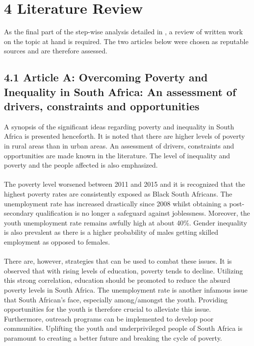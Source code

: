 \chapter*{4 Literature Review}
\label{lit}
As the final part of the step-wise analysis detailed in \textbf{}, a review of written work on the topic at hand is required. The two articles below were chosen as reputable sources and are therefore assessed.
\section*{4.1 Article A: Overcoming Poverty and Inequality in South Africa: An assessment of drivers, constraints and opportunities}
A synopsis of the significant ideas regarding poverty and inequality in South Africa is presented henceforth. It is noted that there are higher levels of poverty in rural areas than in urban areas. An assessment of drivers, constraints and opportunities are made known in the literature. The level of inequality and poverty and the people affected is also emphasized. \cite{WorldBankGroup2018}
\\\\
The poverty level worsened between 2011 and 2015 and it is recognized that the highest poverty rates are consistently exposed as Black South Africans. The unemployment rate has increased drastically since 2008 whilst obtaining a post-secondary qualification is no longer a safeguard against joblessness. Moreover, the youth unemployment rate remains awfully high at about 40\%. Gender inequality is also prevalent as there is a higher probability of males getting skilled employment as opposed to females. \cite{WorldBankGroup2018}
\\\\
There are, however, strategies that can be used to combat these issues. It is observed that with rising levels of education, poverty tends to decline. Utilizing this strong correlation, education should be promoted to reduce the absurd poverty levels in South Africa. The unemployment rate is another infamous issue that South African’s face, especially among/amongst the youth. Providing opportunities for the youth is therefore crucial to alleviate this issue. Furthermore, outreach programs can be implemented to develop poor communities. Uplifting the youth and underprivileged people of South Africa is paramount to creating a better future and breaking the cycle of poverty. \cite{WorldBankGroup2018}


